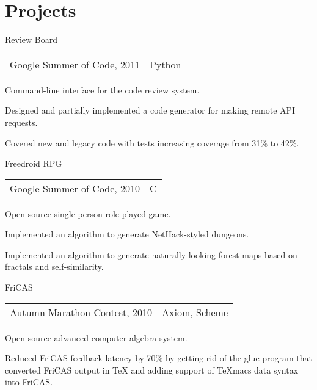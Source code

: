\documentclass[a4paper]{article}
\begin{document}
\section{Projects}
\begin{multicols}{2}
  \raggedcolumns
  \begin{project2}{Review Board}{\begin{tabular}{@{}l|l}Google Summer of Code, 2011 & Python\\\end{tabular}}
    Command-line interface for the code review system.
    \begin{items}
    \item Designed and partially implemented a code generator for making remote API requests.
    \item Covered new and legacy code with tests increasing coverage from 31$\%$ to 42$\%$.
    \end{items}
  \end{project2}

  \begin{project2}{Freedroid RPG}{\begin{tabular}{@{}l|l}Google Summer of Code, 2010 & C\\\end{tabular}}
    Open-source single person role-played game.
    \begin{items}
    \item Implemented an algorithm to generate NetHack-styled dungeons.
    \item Implemented an algorithm to generate naturally looking forest maps based on fractals and self-similarity.
    \end{items}
  \end{project2}

  \columnbreak

  \begin{project2}{FriCAS}{\begin{tabular}{@{}l|l}Autumn Marathon Contest, 2010 & Axiom, Scheme\\\end{tabular}}
    Open-source advanced computer algebra system.
    \begin{items}
    \item Reduced FriCAS feedback latency by 70$\%$ by getting rid of the glue program that converted FriCAS output in \TeX{} and adding support of TeXmacs data syntax into FriCAS.
    \end{items}
  \end{project2}


\end{multicols}
\end{document}
